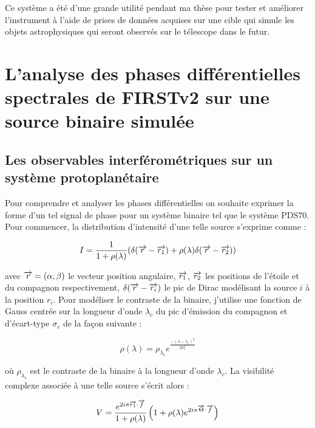 Ce système a été d'une grande utilité pendant ma thèse pour tester et améliorer l'instrument à l'aide de prises de données acquises sur une cible qui simule les objets astrophysiques qui seront observés sur le télescope dans le futur.


\section{L'analyse des phases différentielles spectrales de FIRSTv2 sur une source binaire simulée}
\label{sec:PhaseDiffAnalyse}

\subsection{Les observables interférométriques sur un système protoplanétaire}

Pour comprendre et analyser les phases différentielles on souhaite exprimer la forme d'un tel signal de phase pour un système binaire tel que le système PDS70. Pour commencer, la distribution d'intensité d'une telle source s'exprime comme :

\begin{equation}
    I = \frac{1}{1 + \rho(\lambda)} (\delta(\overrightarrow{r} - \overrightarrow{r_1}) + \rho(\lambda) \delta(\overrightarrow{r} - \overrightarrow{r_2}))
\end{equation}

avec $\overrightarrow{r} = (\alpha, \beta)$ le vecteur position angulaire, $\overrightarrow{r_1}$, $\overrightarrow{r_2}$ les positions de l'étoile et du compagnon respectivement, $\delta(\overrightarrow{r} - \overrightarrow{r_i})$ le pic de Dirac modélisant la source $i$ à la position $r_i$. Pour modéliser le contraste de la binaire, j'utilise une fonction de Gauss centrée sur la longueur d'onde $\lambda_c$ du pic d'émission du compagnon et d'écart-type $\sigma_c$ de la façon suivante : 

\begin{equation}
    \rho(\lambda) = \rho_{\lambda_c} e^{\frac{-(\lambda - \lambda_c)^2}{2 \sigma_{c}^2}}
\end{equation}

où $\rho_{\lambda_c}$ est le contraste de la binaire à la longueur d'onde $\lambda_c$. La visibilité complexe associée à une telle source s'écrit alors :

\begin{equation}
    V = \frac{e^{2i\pi \overrightarrow{r_1} \cdot \overrightarrow{f}}}{1 + \rho(\lambda)} \left( 1 + \rho(\lambda) e^{2i\pi \overrightarrow{\Theta} \cdot \overrightarrow{f}} \right)
\end{equation}

